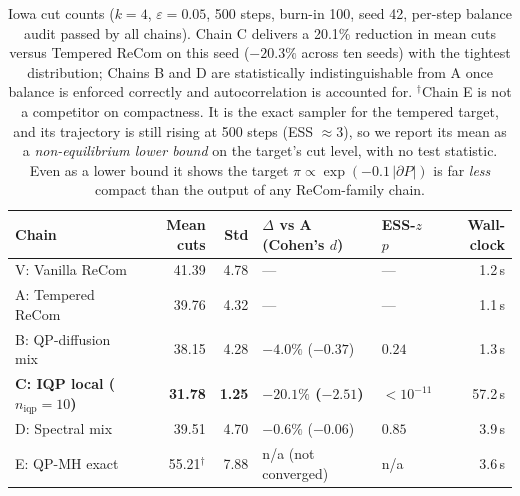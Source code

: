 \documentclass[11pt]{article}
\begin{document}
\begin{table}[htbp]
\centering
\small
\begin{tabular}{lrrllr}
\toprule
Chain & Mean cuts & Std & $\Delta$ vs A (Cohen's $d$) & ESS-$z$ $p$ & Wall-clock \\
\midrule
V: Vanilla ReCom         & 41.39 & 4.78 & ---                & ---     & 1.2\,s \\
A: Tempered ReCom        & 39.76 & 4.32 & ---                & ---     & 1.1\,s \\
B: QP-diffusion mix      & 38.15 & 4.28 & $-4.0\%$ ($-0.37$) & $0.24$  & 1.3\,s \\
\textbf{C: IQP local ($n_{\mathrm{iqp}} = 10$)}
                         & \textbf{31.78} & \textbf{1.25}
                         & \textbf{$-20.1\%$ ($-2.51$)} & $< 10^{-11}$ & 57.2\,s \\
D: Spectral mix          & 39.51 & 4.70 & $-0.6\%$ ($-0.06$) & $0.85$  & 3.9\,s \\
E: QP-MH exact           & 55.21$^{\dagger}$ & 7.88 & n/a (not converged) & n/a & 3.6\,s \\
\bottomrule
\end{tabular}
\caption{Iowa cut counts ($k = 4$, $\varepsilon = 0.05$, 500 steps,
  burn-in 100, seed 42, per-step balance audit passed by all chains).
  Chain C delivers a 20.1\% reduction in mean cuts versus Tempered
  ReCom on this seed ($-20.3\%$ across ten seeds) with the tightest
  distribution; Chains B and D are
  statistically indistinguishable from A once balance is enforced
  correctly and autocorrelation is accounted for. $^{\dagger}$Chain E
  is not a competitor on compactness. It is the exact sampler for the
  tempered target, and its trajectory is still rising at 500 steps
  (ESS $\approx 3$), so we report its mean as a \emph{non-equilibrium
  lower bound} on the target's cut level, with no test statistic.
  Even as a lower bound it shows the target
  $\pi \propto \exp(-0.1\,|\partial P|)$ is far \emph{less} compact
  than the output of any ReCom-family chain.}\label{tab:iowa-headline}
\end{table}
\end{document}
